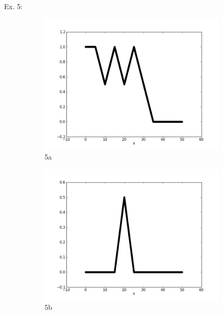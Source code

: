 \documentclass{report}
\begin{document}
\newpage
Ex. 5:
\begin{figure}[ht]
        \begin{subfigure}[b]{0.5\textwidth}
                \centering
                \includegraphics[width=\textwidth]{ex5a.png}
                \caption{5a}
        \end{subfigure}
	\begin{subfigure}[b]{0.5\textwidth}
                \centering
                \includegraphics[width=\textwidth]{ex5b.png}
                \caption{5b}
	\end{subfigure}
	\begin{subfigure}[b]{0.5\textwidth}
                \centering

\end{subfigure}
\end{figure}
\end{document}
